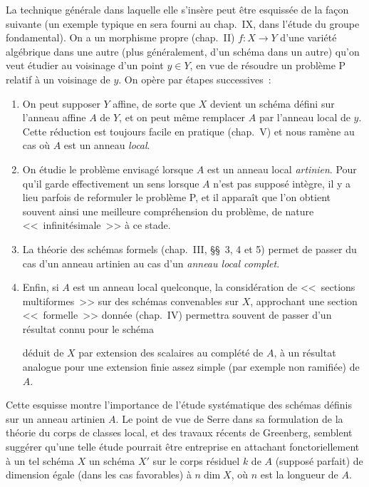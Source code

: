 La technique générale dans laquelle elle s'insère peut être esquissée de la façon suivante (un exemple typique en sera fourni au chap.~IX, dans l'étude du groupe fondamental).
On a un morphisme propre (chap.~II) $f:X\to Y$ d'une variété algébrique dans une autre (plus généralement, d'un schéma dans un autre) qu'on veut étudier au voisinage d'un point $y\in Y$, en vue de résoudre un problème P relatif à un voisinage de $y$.
On opère par étapes successives~:
\begin{enumerate}
  \item[$1^\circ$] On peut supposer $Y$ affine, de sorte que $X$ devient un schéma défini sur l'anneau affine $A$ de $Y$, et on peut même remplacer $A$ par l'anneau local de $y$.
  Cette réduction est toujours facile en pratique (chap.~V) et nous ramène au cas où $A$ est un anneau \emph{local}.
  \item[$2^\circ$] On étudie le problème envisagé lorsque $A$ est un anneau local \emph{artinien}.
  Pour qu'il garde effectivement un sens lorsque $A$ n'est pas supposé intègre, il y a lieu parfois de reformuler le problème P, et il apparaît que l'on obtient souvent ainsi une meilleure compréhension du problème, de nature <<~infinitésimale~>> à ce stade.
  \item[$3^\circ$] La théorie des schémas formels (chap.~III, \S\S~3, 4 et 5) permet de passer du cas d'un anneau artinien au cas d'un \emph{anneau local complet}.
  \item[$4^\circ$] Enfin, si $A$ est un anneau local quelconque, la considération de <<~sections multiformes~>> sur des schémas convenables sur $X$, approchant une section <<~formelle~>> donnée (chap.~IV) permettra souvent de passer d'un résultat connu pour le schéma

  déduit de $X$ par extension des scalaires au complété de $A$, à un résultat analogue pour une extension finie assez simple (par exemple non ramifiée) de $A$.
\end{enumerate}

Cette esquisse montre l'importance de l'étude systématique des schémas définis sur un anneau artinien $A$.
Le point de vue de Serre dans sa formulation de la théorie du corps de classes local, et des travaux récents de Greenberg, semblent suggérer qu'une telle étude pourrait être entreprise en attachant fonctoriellement à un tel schéma $X$ un schéma $X'$ sur le corps résiduel $k$ de $A$ (supposé parfait) de dimension égale (dans les cas favorables) à $n\dim X$, où $n$ est la longueur de $A$.

